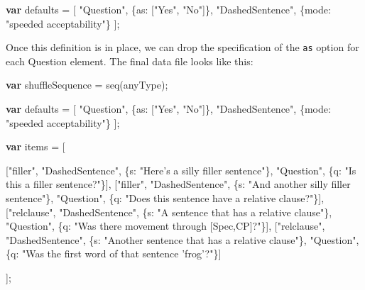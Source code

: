 \documentclass[]{article}
\newenvironment{Shaded}{}{}
\newcommand{\KeywordTok}[1]{\textcolor[rgb]{0.00,0.44,0.13}{\textbf{{#1}}}}
\newcommand{\DataTypeTok}[1]{\textcolor[rgb]{0.56,0.13,0.00}{{#1}}}
\newcommand{\StringTok}[1]{\textcolor[rgb]{0.25,0.44,0.63}{{#1}}}
\newcommand{\FunctionTok}[1]{\textcolor[rgb]{0.02,0.16,0.49}{{#1}}}
\newcommand{\NormalTok}[1]{{#1}}
\begin{document}
\begin{Shaded}
\begin{Highlighting}[]
    \KeywordTok{var} \NormalTok{defaults = [}
        \StringTok{"Question"}\NormalTok{, \{}\DataTypeTok{as}\NormalTok{: [}\StringTok{"Yes"}\NormalTok{, }\StringTok{"No"}\NormalTok{]\},}
        \StringTok{"DashedSentence"}\NormalTok{, \{}\DataTypeTok{mode}\NormalTok{: }\StringTok{"speeded acceptability"}\NormalTok{\}}
    \NormalTok{];}
\end{Highlighting}
\end{Shaded}

Once this definition is in place, we can drop the specification of the
\texttt{as} option for each Question element. The final data file looks
like this:

\begin{Shaded}
\begin{Highlighting}[]
    \KeywordTok{var} \NormalTok{shuffleSequence = }\FunctionTok{seq}\NormalTok{(anyType);}

    \KeywordTok{var} \NormalTok{defaults = [}
        \StringTok{"Question"}\NormalTok{, \{}\DataTypeTok{as}\NormalTok{: [}\StringTok{"Yes"}\NormalTok{, }\StringTok{"No"}\NormalTok{]\},}
        \StringTok{"DashedSentence"}\NormalTok{, \{}\DataTypeTok{mode}\NormalTok{: }\StringTok{"speeded acceptability"}\NormalTok{\}}
    \NormalTok{];}

    \KeywordTok{var} \NormalTok{items = [}

    \NormalTok{[}\StringTok{"filler"}\NormalTok{, }\StringTok{"DashedSentence"}\NormalTok{, \{}\DataTypeTok{s}\NormalTok{: }\StringTok{"Here's a silly filler sentence"}\NormalTok{\},}
               \StringTok{"Question"}\NormalTok{, \{}\DataTypeTok{q}\NormalTok{: }\StringTok{"Is this a filler sentence?"}\NormalTok{\}],}
    \NormalTok{[}\StringTok{"filler"}\NormalTok{, }\StringTok{"DashedSentence"}\NormalTok{, \{}\DataTypeTok{s}\NormalTok{: }\StringTok{"And another silly filler sentence"}\NormalTok{\},}
               \StringTok{"Question"}\NormalTok{, \{}\DataTypeTok{q}\NormalTok{: }\StringTok{"Does this sentence have a relative clause?"}\NormalTok{\}],}
    \NormalTok{[}\StringTok{"relclause"}\NormalTok{, }\StringTok{"DashedSentence"}\NormalTok{, \{}\DataTypeTok{s}\NormalTok{: }\StringTok{"A sentence that has a relative clause"}\NormalTok{\},}
                  \StringTok{"Question"}\NormalTok{, \{}\DataTypeTok{q}\NormalTok{: }\StringTok{"Was there movement through [Spec,CP]?"}\NormalTok{\}],}
    \NormalTok{[}\StringTok{"relclause"}\NormalTok{, }\StringTok{"DashedSentence"}\NormalTok{, \{}\DataTypeTok{s}\NormalTok{: }\StringTok{"Another sentence that has a relative clause"}\NormalTok{\},}
                  \StringTok{"Question"}\NormalTok{, \{}\DataTypeTok{q}\NormalTok{: }\StringTok{"Was the first word of that sentence 'frog'?"}\NormalTok{\}]}

    \NormalTok{];}
\end{Highlighting}
\end{Shaded}
\end{document}
